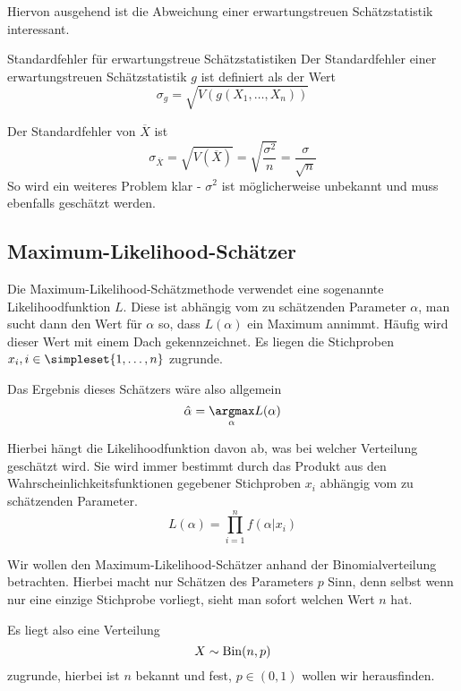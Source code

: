 Hiervon ausgehend ist die Abweichung einer erwartungstreuen Schätzstatistik interessant.
\begin{definition}{Standardfehler für erwartungstreue Schätzstatistiken}
	Der Standardfehler einer erwartungstreuen Schätzstatistik $g$ ist definiert als der Wert%
	\begin{equation*}
		\sigma_g = \sqrt{V(g(X_1,\ldots,X_n))}
	\end{equation*}
\end{definition}
Der Standardfehler von $\overline X$ ist
\begin{equation*}
	\sigma_{\overline X} = \sqrt{V(\overline X)}= \sqrt{\frac{\sigma^2}{n}}=\frac\sigma {\sqrt n}
\end{equation*}
So wird ein weiteres Problem klar - $\sigma^2$ ist möglicherweise unbekannt und muss ebenfalls geschätzt werden.



\subsection{Maximum-Likelihood-Schätzer}
Die Maximum-Likelihood-Schätzmethode verwendet eine sogenannte Likelihoodfunktion $L$. Diese ist abhängig vom zu schätzenden Parameter $\alpha$, man sucht dann den Wert für $\alpha$ so, dass $L(\alpha)$ ein Maximum annimmt. Häufig wird dieser Wert mit einem Dach gekennzeichnet. Es liegen die Stichproben $x_i, i\in\simpleset{1,\ldots,n}$ zugrunde.

Das Ergebnis dieses Schätzers wäre also allgemein
\begin{equation*}
	\hat\alpha = \underset\alpha\argmax L(\alpha)
\end{equation*}

Hierbei hängt die Likelihoodfunktion davon ab, was bei welcher Verteilung geschätzt wird. Sie wird immer bestimmt durch das Produkt aus den Wahrscheinlichkeitsfunktionen gegebener Stichproben $x_i$ abhängig vom zu schätzenden Parameter.
\begin{equation}
	L(\alpha) = \prod_{i=1}^{n} f(\alpha|x_i) \label{eq:likelihoodfunktion}
\end{equation}

Wir wollen den Maximum-Likelihood-Schätzer anhand der Binomialverteilung betrachten.
Hierbei macht nur Schätzen des Parameters $p$ Sinn, denn selbst wenn nur eine einzige Stichprobe vorliegt, sieht man sofort welchen Wert $n$ hat.

Es liegt also eine Verteilung 
\begin{equation*}
	X\sim\operatorname{Bin}(n,p)
\end{equation*}
zugrunde, hierbei ist $n$ bekannt und fest, $p\in(0,1)$ wollen wir herausfinden.

